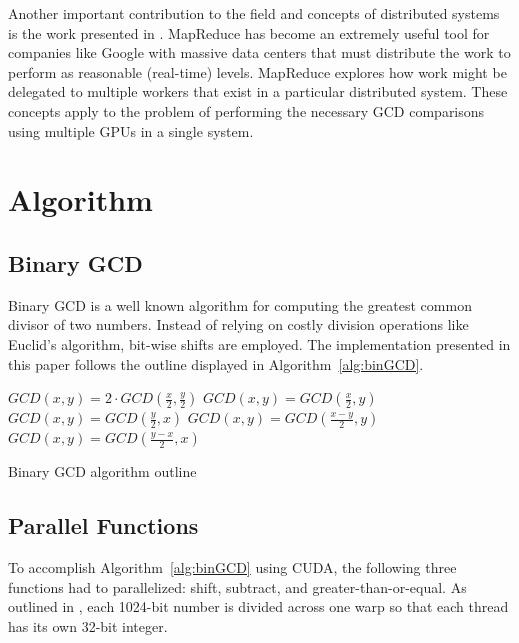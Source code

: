 \documentclass[smallextended]{svjour3}       %
\begin{document}
Another important contribution to the field and concepts of distributed systems
is the work presented in \cite{dean2008mapreduce}. MapReduce has become an
extremely useful tool for companies like Google with massive data centers that
must distribute the work to perform as reasonable (real-time) levels. MapReduce
explores how work might be delegated to multiple workers that exist in a
particular distributed system. These concepts apply to the problem of
performing the necessary GCD comparisons using multiple GPUs in a single
system.


\section{Algorithm}
\label{sec:alg}

\subsection{Binary GCD}
\label{subsec:binGCD}
Binary GCD is a well known algorithm for computing the greatest common divisor 
of two numbers. Instead of relying on costly division operations like Euclid's 
algorithm, bit-wise shifts are employed. The implementation
presented in this paper follows the outline displayed in
Algorithm~\ref{alg:binGCD}.

\begin{algorithm}
   \nl{} {
      \nl{} {
         \nl$GCD(x, y) = 2 \cdot GCD(\frac{x}{2}, \frac{y}{2})$\;
      }\nl{} {
         \nl$GCD(x, y) = GCD(\frac{x}{2}, y)$\;
      }\nl{} {
         \nl$GCD(x, y) = GCD(\frac{y}{2}, x)$\;
      }\nl{} {
         \nl{} {
            \nl$GCD(x, y) = GCD(\frac{x - y}{2}, y)$\;
         }{
            \nl$GCD(x, y) = GCD(\frac{y - x}{2}, x)$\;
        }
      }
   }
   \caption{Binary GCD algorithm outline}
   \label{alg:binGCD}
\end{algorithm}

\subsection{Parallel Functions}
\label{subsec:parfunc}
To accomplish Algorithm~\ref{alg:binGCD} using CUDA, the following three 
functions had to parallelized: shift, subtract, and greater-than-or-equal. As 
outlined in \cite{fujimoto2009high}, each 1024-bit number is divided across one 
warp so that each thread has its own 32-bit integer. 
\end{document}
